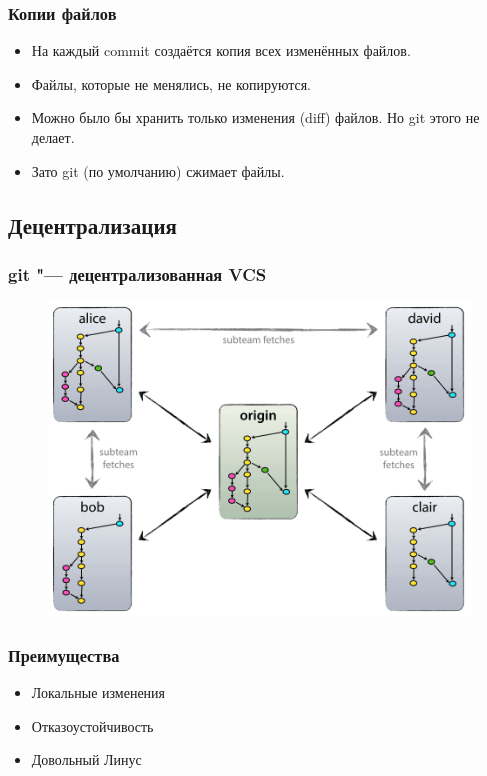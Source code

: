 \documentclass[pdf,russian]{beamer}
\begin{document}
\begin{frame}
    \frametitle{Копии файлов}
    \begin{itemize}
        \pause
        \item На каждый commit создаётся копия всех изменённых файлов.
        \pause
        \item Файлы, которые не менялись, не копируются.
        \pause
        \item Можно было бы хранить только изменения (diff) файлов.
            \pause Но git этого не делает.
        \pause
        \item Зато git (по умолчанию) сжимает файлы.
    \end{itemize}
\end{frame}

\subsection{Децентрализация}

\begin{frame}
    \frametitle{git "--- децентрализованная VCS}
    \begin{figure}
        \includegraphics[height=0.8\textheight]{decentr}
    \end{figure}
\end{frame}

\begin{frame}
    \frametitle{Преимущества}
    \begin{itemize}
        \pause
        \item Локальные изменения
        \pause
        \item Отказоустойчивость
        \pause
        \item Довольный Линус
    \end{itemize}
\end{frame}
\end{document}
